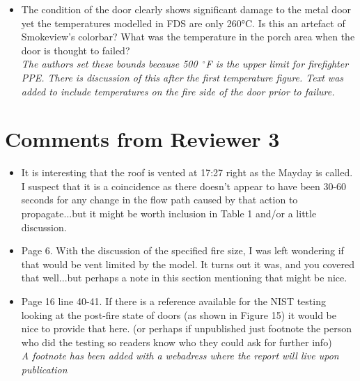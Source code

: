 \documentclass[12pt]{article}
\begin{document}
\begin{itemize}
{\it The firefighter with the Captain was not seriously injured.}
\item The condition of the door clearly shows significant damage to the metal door yet the temperatures modelled in FDS are only 260°C.   Is this an artefact of Smokeview's colorbar?  What was the temperature in the porch area when the door is thought to failed?\\
{\it The authors set these bounds because 500~$^{\circ}$F is the upper limit for firefighter PPE. There is discussion of this after the first temperature figure. Text was added to include temperatures on the fire side of the door prior to failure.}
\end{itemize}


\section{Comments from Reviewer 3}
\begin{itemize}
\item It is interesting that the roof is vented at 17:27 right as the Mayday is called.  I suspect that it is a coincidence as there doesn't appear to have been 30-60 seconds for any change in the flow path caused by that action to propagate...but it might be worth inclusion in Table 1 and/or a little discussion.
\item Page 6.  With the discussion of the specified fire size, I was left wondering if that would be vent limited by the model.  It turns out it was, and you covered that well...but perhaps a note in this section mentioning that might be nice.
\item Page 16 line 40-41.  If there is a reference available for the NIST testing looking at the post-fire state of doors (as shown in Figure 15) it would be nice to provide that here. (or perhaps if unpublished just footnote the person who did the testing so readers know who they could ask for further info) \\
{\it A footnote has been added with a webadress where the report will live upon publication}
\end{itemize}
\end{document}

